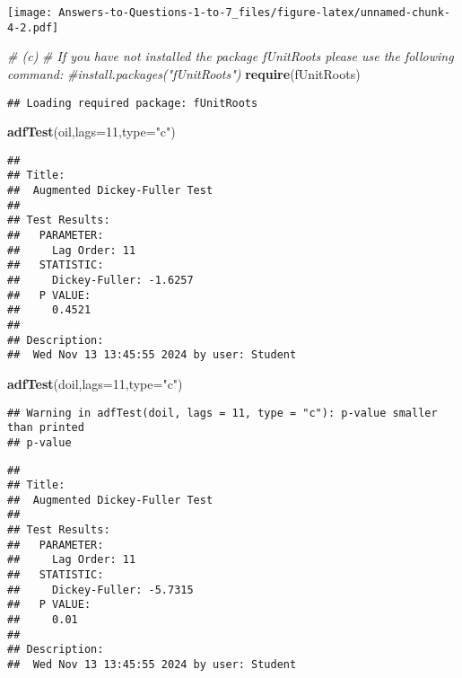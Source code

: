 \documentclass[
]{article}
\newenvironment{Shaded}{\begin{snugshade}}{\end{snugshade}}
\newcommand{\AttributeTok}[1]{\textcolor[rgb]{0.13,0.29,0.53}{#1}}
\newcommand{\CommentTok}[1]{\textcolor[rgb]{0.56,0.35,0.01}{\textit{#1}}}
\newcommand{\DecValTok}[1]{\textcolor[rgb]{0.00,0.00,0.81}{#1}}
\newcommand{\FunctionTok}[1]{\textcolor[rgb]{0.13,0.29,0.53}{\textbf{#1}}}
\newcommand{\NormalTok}[1]{#1}
\newcommand{\StringTok}[1]{\textcolor[rgb]{0.31,0.60,0.02}{#1}}
\begin{document}
\texttt{[image: Answers-to-Questions-1-to-7\_files/figure-latex/unnamed-chunk-4-2.pdf]}

\begin{Shaded}
\begin{Highlighting}[]
\CommentTok{\# (c)}
\CommentTok{\# If you have not installed the package fUnitRoots please use the following command:}
\CommentTok{\#install.packages("fUnitRoots")}
\FunctionTok{require}\NormalTok{(fUnitRoots)}
\end{Highlighting}
\end{Shaded}

\begin{verbatim}
## Loading required package: fUnitRoots
\end{verbatim}

\begin{Shaded}
\begin{Highlighting}[]
\FunctionTok{adfTest}\NormalTok{(oil,}\AttributeTok{lags=}\DecValTok{11}\NormalTok{,}\AttributeTok{type=}\StringTok{"c"}\NormalTok{)}
\end{Highlighting}
\end{Shaded}

\begin{verbatim}
## 
## Title:
##  Augmented Dickey-Fuller Test
## 
## Test Results:
##   PARAMETER:
##     Lag Order: 11
##   STATISTIC:
##     Dickey-Fuller: -1.6257
##   P VALUE:
##     0.4521 
## 
## Description:
##  Wed Nov 13 13:45:55 2024 by user: Student
\end{verbatim}

\begin{Shaded}
\begin{Highlighting}[]
\FunctionTok{adfTest}\NormalTok{(doil,}\AttributeTok{lags=}\DecValTok{11}\NormalTok{,}\AttributeTok{type=}\StringTok{"c"}\NormalTok{)}
\end{Highlighting}
\end{Shaded}

\begin{verbatim}
## Warning in adfTest(doil, lags = 11, type = "c"): p-value smaller than printed
## p-value
\end{verbatim}

\begin{verbatim}
## 
## Title:
##  Augmented Dickey-Fuller Test
## 
## Test Results:
##   PARAMETER:
##     Lag Order: 11
##   STATISTIC:
##     Dickey-Fuller: -5.7315
##   P VALUE:
##     0.01 
## 
## Description:
##  Wed Nov 13 13:45:55 2024 by user: Student
\end{verbatim}
\end{document}
